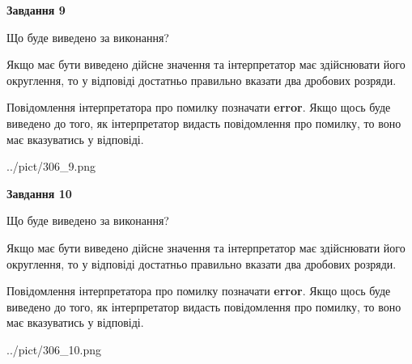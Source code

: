 \documentclass[12pt, ukrainian]{article}
\begin{document}
{\begin {Large}
{\begin {center}\textbf{Завдання 9}\end {center}}\par
Що буде виведено за виконання? \par

Якщо має бути виведено дійсне значення та інтерпретатор має здійснювати його округлення, 
то у відповіді достатньо правильно вказати два дробових розряди.

Повідомлення інтерпретатора про помилку позначати \textbf{error}.
Якщо щось буде виведено до того, як інтерпретатор видасть повідомлення про помилку, 
то воно має вказуватись у відповіді. \par

\begin{center}
	{../pict/306_9.png}
\end{center}
\newpage

{\begin {center}\textbf{Завдання 10}\end {center}}\par
Що буде виведено за виконання? \par

Якщо має бути виведено дійсне значення та інтерпретатор має здійснювати його округлення, 
то у відповіді достатньо правильно вказати два дробових розряди.

Повідомлення інтерпретатора про помилку позначати \textbf{error}.
Якщо щось буде виведено до того, як інтерпретатор видасть повідомлення про помилку, 
то воно має вказуватись у відповіді. \par

\begin{center}
	{../pict/306_10.png}
\end{center}
\newpage

\end {Large}}
\end{document}
